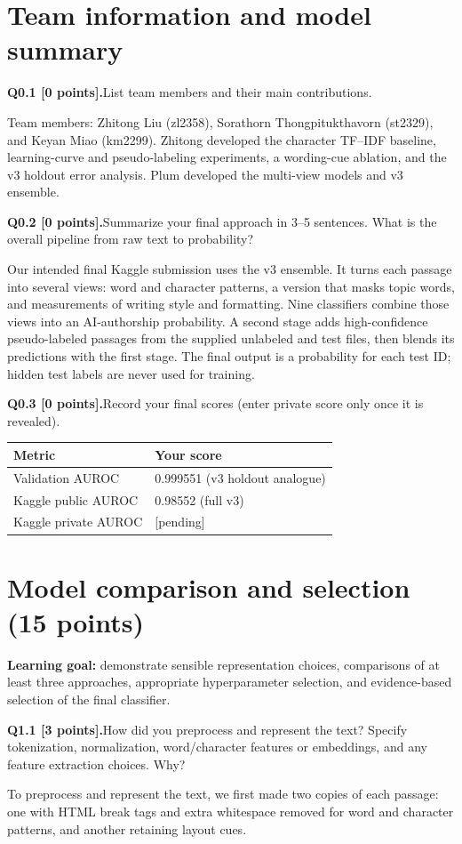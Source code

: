 \documentclass[11pt,letterpaper]{article}
\newcommand{\question}[2]{\needspace{4\baselineskip}\par\addvspace{0.45em}\noindent\textbf{#1}\quad #2\par\nobreak\vspace{0.1em}}
\begin{document}
\section{Team information and model summary}
\question{Q0.1 [0 points].}{List team members and their main contributions.}
Team members: Zhitong Liu (zl2358), Sorathorn Thongpitukthavorn (st2329), and Keyan Miao (km2299). Zhitong developed the character TF--IDF baseline, learning-curve and pseudo-labeling experiments, a wording-cue ablation, and the v3 holdout error analysis. Plum developed the multi-view models and v3 ensemble.
\question{Q0.2 [0 points].}{Summarize your final approach in 3--5 sentences. What is the overall pipeline from raw text to probability?}
Our intended final Kaggle submission uses the v3 ensemble. It turns each passage into several views: word and character patterns, a version that masks topic words, and measurements of writing style and formatting. Nine classifiers combine those views into an AI-authorship probability. A second stage adds high-confidence pseudo-labeled passages from the supplied unlabeled and test files, then blends its predictions with the first stage. The final output is a probability for each test ID; hidden test labels are never used for training.
\question{Q0.3 [0 points].}{Record your final scores (enter private score only once it is revealed).}
\begin{tabularx}{\linewidth}{@{}Yp{1.8in}@{}}\toprule Metric & Your score \\ \midrule Validation AUROC & 0.999551 (v3 holdout analogue) \\ Kaggle public AUROC & 0.98552 (full v3) \\ Kaggle private AUROC & [pending] \\ \bottomrule\end{tabularx}
\newpage
\section{Model comparison and selection (15 points)}
\textbf{Learning goal:} demonstrate sensible representation choices, comparisons of at least three approaches, appropriate hyperparameter selection, and evidence-based selection of the final classifier.

\question{Q1.1 [3 points].}{How did you preprocess and represent the text? Specify tokenization, normalization, word/character features or embeddings, and any feature extraction choices. Why?}
To preprocess and represent the text, we first made two copies of each passage: one with HTML break tags and extra whitespace removed for word and character patterns, and another retaining layout cues.
\newline
\end{document}
